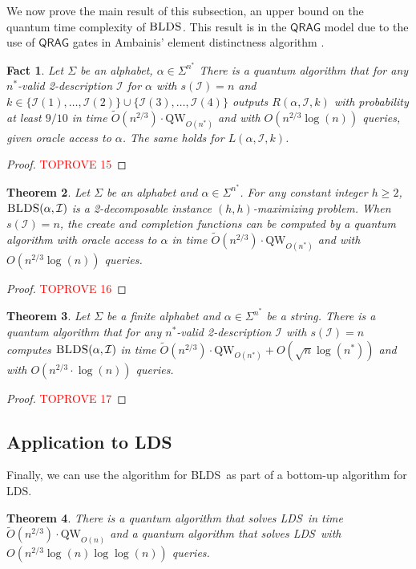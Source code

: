 \documentclass[12pt]{article}
\newcommand{\qw}{\mathrm{QW}}
\newcommand{\Iset}{\mathcal{I}}
\newcommand{\blds}{\textsc{BLDS}}
\newcommand{\lds}{\textsc{LDS}}
\newtheorem{theorem}{Theorem}
\newtheorem{fact}[theorem]{Fact}
\theoremstyle{definition}
\begin{document}
We now prove the main result of this subsection, an upper bound on the quantum time complexity of $\blds$.  This result is in the $\mathsf{QRAG}$ model due to the use of $\mathsf{QRAG}$ gates in Ambainis' element distinctness algorithm 
\cite{Amb07}.

\begin{fact}
\label{fact:ed_binary}
Let $\Sigma$ be an alphabet, $\alpha \in \Sigma^{n^*}$
There is a quantum algorithm that for any $n^*$-valid 2-description $\Iset$ for $\alpha$ with $s(\Iset) = n$ and
$k \in \{\Iset(1),\ldots, \Iset(2)\} \cup \{\Iset(3), \ldots, \Iset(4)\}$ outputs $R(\alpha, \Iset, k)$ with probability at least $9/10$ in time $\tilde O(n^{2/3}) \cdot \qw_{O(n^*)}$ and with $O(n^{2/3} \log(n))$ queries, given oracle access to $\alpha$.  The same holds for $L(\alpha, \Iset, k)$.
\end{fact}

\begin{proof}\textcolor{red}{TOPROVE 15}\end{proof}

\begin{theorem}
\label{thm:comp}
Let $\Sigma$ be an alphabet and $\alpha \in \Sigma^{n^*}$.
For any constant integer $h \ge 2$, $\blds(\alpha, \Iset)$ is a 2-decomposable instance $(h, h)$-maximizing problem.  
When $s(\Iset) = n$, the create and completion functions can be computed by a quantum algorithm with oracle access to $\alpha$ in time $\tilde O(n^{2/3}) \cdot \qw_{O(n^*)}$ and with $O(n^{2/3} \log(n))$ queries.
\end{theorem}

\begin{proof}\textcolor{red}{TOPROVE 16}\end{proof}

\begin{theorem}
\label{thm:qblds}
Let $\Sigma$ be a finite alphabet and $\alpha \in \Sigma^{n^*}$ be a string.  There is a quantum algorithm that for any $n^*$-valid 2-description $\Iset$ with $s(\Iset)=n$ computes $\blds(\alpha, \Iset)$ in time $\widetilde{O}(n^{2/3}) \cdot \qw_{O(n^*)} + O(\sqrt{n} \log(n^*))$ and with $O(n^{2/3} \cdot \log(n))$ queries.
\end{theorem}

\begin{proof}\textcolor{red}{TOPROVE 17}\end{proof}

\subsection{Application to \lds}
Finally, we can use the algorithm for \blds\ as part of a bottom-up algorithm for \lds.
\begin{theorem} \label{thm:lds}
There is a quantum algorithm that solves \lds\ in time $\widetilde O(n^{2/3}) \cdot \qw_{O(n)}$ and a quantum algorithm that solves \lds\ with $O(n^{2/3} \log(n) \log \log(n))$ queries.
\end{theorem}
\end{document}
